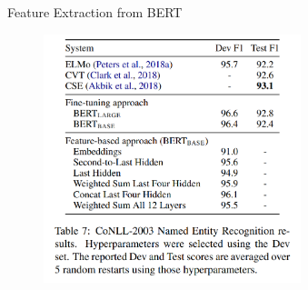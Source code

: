 
\begin{frame}{Feature Extraction from BERT}

	\begin{figure}
	\centering
		\includegraphics[width = 7.5cm]{figure/bert-featextr-results.png}\\ 
	\end{figure}

\end{frame}


\endlecture


